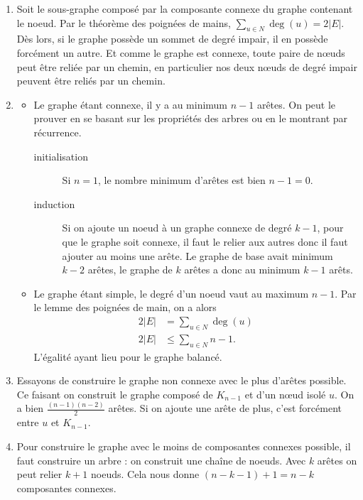 \begin{solution}
  \begin{enumerate}
    \item Soit le sous-graphe composé par la composante connexe du graphe contenant le noeud.
      Par le théorème des poignées de mains, $\sum_{u \in N} \deg(u) = 2|E|$.
      Dès lors, si le graphe possède un sommet de degré impair, il en possède forcément un autre.
      Et comme le graphe est connexe, toute paire de nœuds peut être reliée par un chemin,
      en particulier nos deux nœuds de degré impair peuvent être reliés par un chemin.
    \item
      \begin{itemize}
        \item Le graphe étant connexe, il y a au minimum $n-1$ arêtes.
          On peut le prouver en se basant sur les propriétés des arbres ou en le montrant par récurrence.
          \begin{description}
            \item[initialisation] Si $n = 1$, le nombre minimum d'arêtes est bien $n - 1 = 0$.
            \item[induction] Si on ajoute un noeud à un graphe connexe de degré $k-1$,
              pour que le graphe soit connexe, il faut
              le relier aux autres donc il faut ajouter au moins une arête.
              Le graphe de base avait minimum $k-2$ arêtes,
              le graphe de $k$ arêtes a donc au minimum $k-1$ arêts.
          \end{description}
        \item Le graphe étant simple, le degré d'un noeud vaut au maximum $n-1$.
          Par le lemme des poignées de main, on a alors
          \begin{align*}
            2|E| & = \sum_{u \in N} \deg(u)\\
            2|E| & \leq \sum_{u \in N} n-1.
          \end{align*}
          L'égalité ayant lieu pour le graphe balancé.
      \end{itemize}
    \item Essayons de construire le graphe non connexe avec le plus d'arêtes possible.
      Ce faisant on construit le graphe composé de $K_{n-1}$ et d'un nœud isolé $u$.
      On a bien $\frac{(n-1)(n-2)}{2}$ arêtes.
      Si on ajoute une arête de plus, c'est forcément entre $u$ et $K_{n-1}$.
    \item Pour construire le graphe avec le moins de composantes connexes possible, il faut construire un arbre : on construit une chaîne de noeuds. Avec $k$ arêtes on peut relier $k+1$ noeuds. Cela nous donne $(n-k-1)+1=n-k$ composantes connexes.
  \end{enumerate}
\end{solution}

